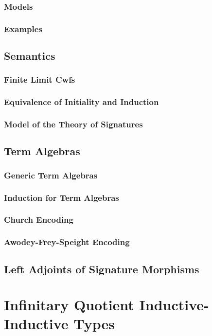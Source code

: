 \documentclass[12pt,a4paper,twoside,openany]{book}
\theoremstyle{remark}
\theoremstyle{definition}
\begin{document}
\subsection{Models}
\subsection{Examples}

\section{Semantics}
\label{sec:fqiit-semantics}
\subsection{Finite Limit Cwfs}
\subsection{Equivalence of Initiality and Induction}
\subsection{Model of the Theory of Signatures}

\section{Term Algebras}
\label{sec:fqiit-term-algebras}
\subsection{Generic Term Algebras}
\subsection{Induction for Term Algebras}
\subsection{Church Encoding}
\subsection{Awodey-Frey-Speight Encoding}

\section{Left Adjoints of Signature Morphisms}

\chapter{Infinitary Quotient Inductive-Inductive Types}
\label{chap:iqiit}
\end{document}
